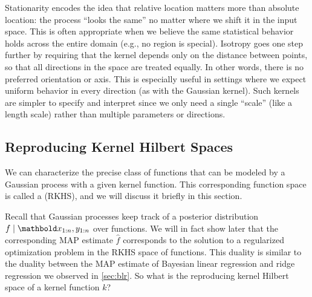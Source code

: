 Stationarity encodes the idea that relative location matters more than absolute location: the process ``looks the same'' no matter where we shift it in the input space.
This is often appropriate when we believe the same statistical behavior holds across the entire domain (e.g., no region is special).
Isotropy goes one step further by requiring that the kernel depends only on the distance between points, so that all directions in the space are treated equally.
In other words, there is no preferred orientation or axis.
This is especially useful in settings where we expect uniform behavior in every direction (as with the Gaussian kernel).
Such kernels are simpler to specify and interpret since we only need a single ``scale'' (like a length scale) rather than multiple parameters or directions.

\subsection{Reproducing Kernel Hilbert Spaces}\label{sec:rkhs}

We can characterize the precise class of functions that can be modeled by a Gaussian process with a given kernel function.
This corresponding function space is called a  (RKHS), and we will discuss it briefly in this section.

Recall that Gaussian processes keep track of a posterior distribution $f \mid \vx_{1:n}, y_{1:n}$ over functions.
We will in fact show later that the corresponding MAP estimate $\hat{f}$ corresponds to the solution to a regularized optimization problem in the RKHS space of functions.
This duality is similar to the duality between the MAP estimate of Bayesian linear regression and ridge regression we observed in \cref{sec:blr}.
So what is the reproducing kernel Hilbert space of a kernel function $k$?


